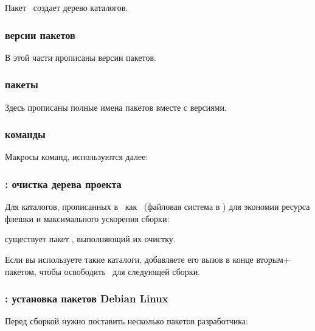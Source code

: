 {Пакет \ создает дерево каталогов. 



\subsubsection{версии пакетов}

В этой части прописаны версии пакетов.



\subsubsection{пакеты}

Здесь прописаны полные имена пакетов вместе с версиями. 



\subsubsection{команды}

Макросы команд, используются далее:



\subsubsection{: очистка дерева проекта}

Для каталогов, прописанных в \ как \ (файловая
система в \ram) для экономии ресурса флешки и максимального ускорения сборки:



существует пакет , выполняющий их очистку.

Если вы используете такие каталоги, добавляете его вызов в конце вторым+ 
пакетом, чтобы освободить \ram\ для следующей сборки. 



\subsubsection{: установка пакетов Debian Linux}

Перед сборкой нужно поставить несколько пакетов разработчика:

}
